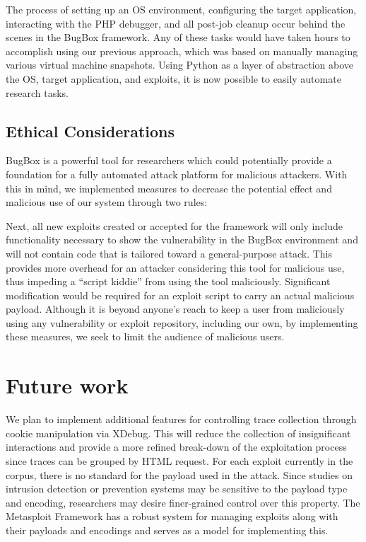 \documentclass[letterpaper,twocolumn,10pt]{article}
\begin{document}
The process of setting up an OS environment, configuring the target application, interacting with the PHP debugger, and all post-job cleanup occur behind the scenes in the BugBox framework. Any of these tasks would have taken hours to accomplish using our previous approach, which was based on manually managing various virtual machine snapshots. Using Python as a layer of abstraction above the OS, target application, and exploits, it is now possible to easily automate research tasks.

\subsection {Ethical Considerations}
BugBox is a powerful tool for researchers which could potentially provide a foundation for a fully automated attack platform for malicious attackers.  With this in mind, we implemented measures to decrease the potential effect and malicious use of our system through two rules:

Next, all new exploits created or accepted for the framework will only include functionality necessary to show the vulnerability in the BugBox environment and will not contain code that is tailored toward a general-purpose attack.  This provides more overhead for an attacker considering this tool for malicious use, thus impeding a ``script kiddie'' from using the tool maliciously.  Significant modification would be required for an exploit script to carry an actual malicious payload.
Although it is beyond anyone's reach to keep a user from maliciously using any vulnerability or exploit repository, including our own, by implementing these measures, we seek to limit the audience of malicious users.

\section{Future work}
We plan to implement additional features for controlling trace collection through cookie manipulation via XDebug. This will reduce the collection of insignificant interactions and provide a more refined break-down of the exploitation process since traces can be grouped by HTML request. For each exploit currently in the corpus, there is no standard for the payload used in the attack. Since studies on intrusion detection or prevention systems may be sensitive to the payload type and encoding, researchers may desire finer-grained control over this property. The Metasploit Framework has a  robust system for managing exploits along with their payloads and encodings and serves as a model for implementing this.
\end{document}
